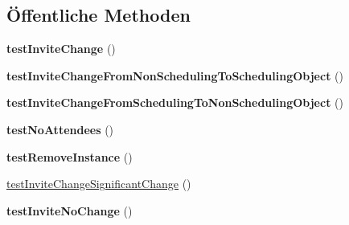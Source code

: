 \subsection*{Öffentliche Methoden}
\begin{DoxyCompactItemize}
\item 
\mbox{\label{class_sabre_1_1_v_object_1_1_i_tip_1_1_broker_update_event_test_a9dec5f11e5f775246ae658307e664f14}} 
{\bfseries test\+Invite\+Change} ()
\item 
\mbox{\label{class_sabre_1_1_v_object_1_1_i_tip_1_1_broker_update_event_test_a047a692ad1995cc2c00beb9a77e85cee}} 
{\bfseries test\+Invite\+Change\+From\+Non\+Scheduling\+To\+Scheduling\+Object} ()
\item 
\mbox{\label{class_sabre_1_1_v_object_1_1_i_tip_1_1_broker_update_event_test_a780ac37f2e69b0e6359247981b6a9524}} 
{\bfseries test\+Invite\+Change\+From\+Scheduling\+To\+Non\+Scheduling\+Object} ()
\item 
\mbox{\label{class_sabre_1_1_v_object_1_1_i_tip_1_1_broker_update_event_test_aec3de0b9668cf79250177e5141dfd7d8}} 
{\bfseries test\+No\+Attendees} ()
\item 
\mbox{\label{class_sabre_1_1_v_object_1_1_i_tip_1_1_broker_update_event_test_afd2666dfbee8b98d714b2f8b1fee76bd}} 
{\bfseries test\+Remove\+Instance} ()
\item 
\mbox{\hyperlink{class_sabre_1_1_v_object_1_1_i_tip_1_1_broker_update_event_test_af78386d4680bacdc6b6c7bb52476136b}{test\+Invite\+Change\+Significant\+Change}} ()
\item 
\mbox{\label{class_sabre_1_1_v_object_1_1_i_tip_1_1_broker_update_event_test_a636a451fd67f5cddd3a9529dd855be1c}} 
{\bfseries test\+Invite\+No\+Change} ()
\item 
\mbox{\label{class_sabre_1_1_v_object_1_1_i_tip_1_1_broker_update_event_test_a376f9230b02c4d060c458651d7f18b30}} 

\end{DoxyCompactItemize}
